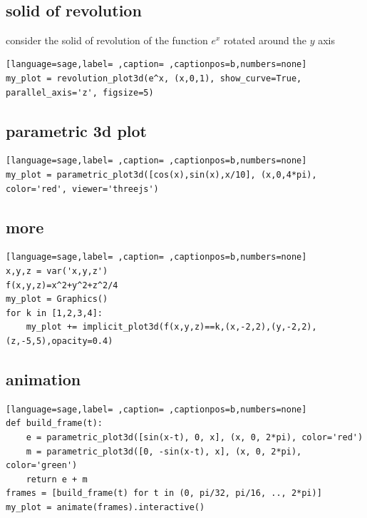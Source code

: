\documentclass[a4paper,12pt]{article}
\begin{document}
\\[0pt]

\subsection{solid of revolution}
\label{sec:org599c331}
consider the solid of revolution of the function \(e^x\) rotated around the \(y\) axis\\[0pt]

\begin{lstlisting}[language=sage,label= ,caption= ,captionpos=b,numbers=none]
my_plot = revolution_plot3d(e^x, (x,0,1), show_curve=True, parallel_axis='z', figsize=5)

\end{lstlisting}

\subsection{parametric 3d plot}
\label{sec:org737b2e8}
\begin{lstlisting}[language=sage,label= ,caption= ,captionpos=b,numbers=none]
my_plot = parametric_plot3d([cos(x),sin(x),x/10], (x,0,4*pi), color='red', viewer='threejs')

\end{lstlisting}

\subsection{more}
\label{sec:orgd47cf8f}
\begin{lstlisting}[language=sage,label= ,caption= ,captionpos=b,numbers=none]
x,y,z = var('x,y,z')
f(x,y,z)=x^2+y^2+z^2/4
my_plot = Graphics()
for k in [1,2,3,4]:
    my_plot += implicit_plot3d(f(x,y,z)==k,(x,-2,2),(y,-2,2),(z,-5,5),opacity=0.4)

\end{lstlisting}

\subsection{animation}
\label{sec:org3c0c8df}
\begin{lstlisting}[language=sage,label= ,caption= ,captionpos=b,numbers=none]
def build_frame(t):
    e = parametric_plot3d([sin(x-t), 0, x], (x, 0, 2*pi), color='red')
    m = parametric_plot3d([0, -sin(x-t), x], (x, 0, 2*pi), color='green')
    return e + m
frames = [build_frame(t) for t in (0, pi/32, pi/16, .., 2*pi)]
my_plot = animate(frames).interactive()

\end{lstlisting}
\end{document}
